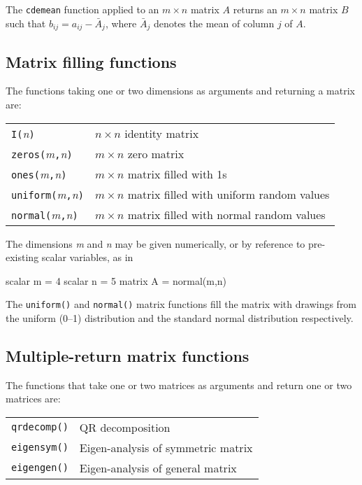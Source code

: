 The \texttt{cdemean} function applied to an $m \times n$ matrix $A$
returns an $m \times n$ matrix $B$ such that $b_{ij} = a_{ij} -
\bar{A}_j$, where $\bar{A}_j$ denotes the mean of column $j$ of $A$.  

\subsection{Matrix filling functions}
\label{matrix-fill}

The functions taking one or two dimensions as arguments and returning
a matrix are:

\begin{center}
\begin{tabular}{ll}
\texttt{I(}\textsl{n}\texttt{)} & $n\times n$ identity matrix \\
\texttt{zeros(}\textsl{m}\texttt{,}\textsl{n}\texttt{)} & 
   $m\times n$ zero matrix \\
\texttt{ones(}\textsl{m}\texttt{,}\textsl{n}\texttt{)} &
   $m\times n$ matrix filled with 1s \\
\texttt{uniform(}\textsl{m}\texttt{,}\textsl{n}\texttt{)} &
   $m\times n$ matrix filled with uniform random values \\
\texttt{normal(}\textsl{m}\texttt{,}\textsl{n}\texttt{)} &
   $m\times n$ matrix filled with normal random values \\
\end{tabular}
\end{center}

The dimensions \textsl{m} and \textsl{n} may be given numerically, or
by reference to pre-existing scalar variables, as in
%
\begin{code}
scalar m = 4
scalar n = 5
matrix A = normal(m,n)
\end{code}
%
The \texttt{uniform()} and \texttt{normal()} matrix functions fill the
matrix with drawings from the uniform (0--1) distribution and the
standard normal distribution respectively.

\subsection{Multiple-return matrix functions}
\label{matrix-multiples}

The functions that take one or two matrices as arguments and return
one or two matrices are:

\begin{center}
\begin{tabular}{ll}
\texttt{qrdecomp()} & QR decomposition \\
\texttt{eigensym()} & Eigen-analysis of symmetric matrix \\
\texttt{eigengen()} & Eigen-analysis of general matrix 
\end{tabular}
\end{center}


